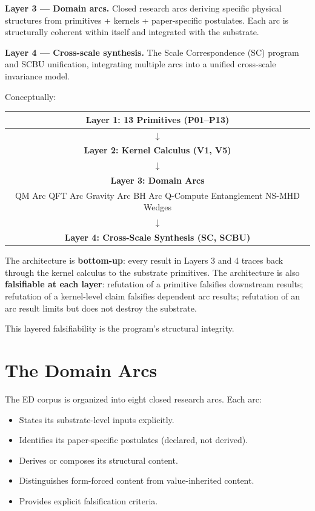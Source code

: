 \documentclass[11pt,a4paper]{article}
\begin{document}
\textbf{Layer 3 --- Domain arcs.} Closed research arcs deriving specific physical structures from primitives + kernels + paper-specific postulates. Each arc is structurally coherent within itself and integrated with the substrate.

\textbf{Layer 4 --- Cross-scale synthesis.} The Scale Correspondence (SC) program and SCBU unification, integrating multiple arcs into a unified cross-scale invariance model.

Conceptually:

\begin{center}
\begin{tabular}{c}
\hline
\textbf{Layer 1: 13 Primitives (P01--P13)} \\
\hline
$\downarrow$ \\
\hline
\textbf{Layer 2: Kernel Calculus (V1, V5)} \\
\hline
$\downarrow$ \\
\hline
\textbf{Layer 3: Domain Arcs} \\
QM Arc \quad QFT Arc \quad Gravity Arc \quad BH Arc \quad Q-Compute \quad Entanglement \quad NS-MHD \quad Wedges \\
\hline
$\downarrow$ \\
\hline
\textbf{Layer 4: Cross-Scale Synthesis (SC, SCBU)} \\
\hline
\end{tabular}
\end{center}

The architecture is \textbf{bottom-up}: every result in Layers 3 and 4 traces back through the kernel calculus to the substrate primitives. The architecture is also \textbf{falsifiable at each layer}: refutation of a primitive falsifies downstream results; refutation of a kernel-level claim falsifies dependent arc results; refutation of an arc result limits but does not destroy the substrate.

This layered falsifiability is the program's structural integrity.

\section{The Domain Arcs}

The ED corpus is organized into eight closed research arcs. Each arc:

\begin{itemize}[noitemsep]
\item States its substrate-level inputs explicitly.
\item Identifies its paper-specific postulates (declared, not derived).
\item Derives or composes its structural content.
\item Distinguishes form-forced content from value-inherited content.
\item Provides explicit falsification criteria.
\end{itemize}
\end{document}
